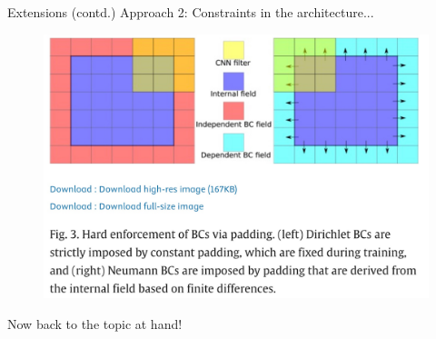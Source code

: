 \documentclass[usenames,dvipsnames]{beamer}
\theoremstyle{definition}
\let\oldcite=\cite
\renewcommand{\cite}[2][]{\textcolor{green}{\oldcite[#1]{#2}}}
\begin{document}
\begin{frame}{Extensions (contd.)}
    Approach 2: Constraints in the architecture...\cite{gao_phygeonet:_2021}
    \begin{figure}
        \centering
        \includegraphics[width=0.8\linewidth]{HardCodedBCsCNN.jpg}
        \label{fig:bc_cnn}
    \end{figure}

    Now back to the topic at hand!
\end{frame}


    


\end{document}
